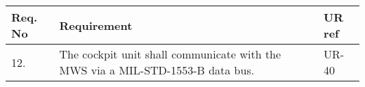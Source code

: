 \begin{center}
    \begin{tabular}{ | l | p{9cm} | l | }
    \hline
    Req. No & Requirement  & UR ref \\ \hline
    12. & The cockpit unit shall communicate with the MWS via a MIL-STD-1553-B data
bus. & UR-40 \\ \hline
    \end{tabular}
\end{center}
